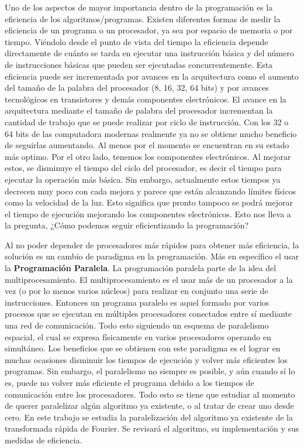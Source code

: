 \documentclass{report}
\begin{document}
Uno de los aspectos de mayor importancia dentro de la programación es la eficiencia de los algoritmos/programas. Existen diferentes formas de medir la eficiencia de un programa o un procesador, ya sea por espacio de memoria o por tiempo. Viéndolo desde el punto de vista del tiempo la eficiencia depende directamente de cuánto se tarda en ejecutar una instrucción básica y del número de instrucciones básicas que pueden ser ejecutadas concurrentemente. Esta eficiencia puede ser incrementada por avances en la arquitectura como el aumento del tamaño de la palabra del procesador (8, 16, 32, 64 bits) y por avances tecnológicos en transistores y demás componentes electrónicos. El avance en la arquitectura mediante el tamaño de palabra del procesador incrementan la cantidad de trabajo que se puede realizar por ciclo de instrucción. Con los 32 o 64 bits de las computadora modernas realmente ya no se obtiene mucho beneficio de seguirlas aumentando. Al menos por el momento se encuentran en su estado más optimo. Por el otro lado, tenemos los componentes electrónicos. Al mejorar estos, se disminuye el tiempo del ciclo del procesador, es decir el tiempo para ejecutar la operación más básica. Sin embargo, actualmente estos tiempos ya decrecen muy poco con cada mejora y parece que están alcanzando límites físicos como la velocidad de la luz. Esto significa que pronto tampoco se podrá mejorar el tiempo de ejecución mejorando los componentes electrónicos. Esto nos lleva a la pregunta, ¿Cómo podemos seguir eficientizando la programación? \medskip

Al no poder depender de procesadores más rápidos para obtener más eficiencia, la solución es un cambio de paradigma en la programación. Más en específico el usar la \textbf{Programación Paralela}. La programación paralela parte de la idea del multiprocesamiento. El multiprocesamiento es el usar más de un procesador a la vez (o por lo menos varios núcleos) para realizar en conjunto una serie de instrucciones. Entonces un programa paralelo es aquel formado por varios procesos que se ejecutan en múltiples procesadores conectados entre sí mediante una red de comunicación. Todo esto siguiendo un esquema de paralelismo espacial, el cual se expresa físicamente en varios procesadores operando en simultáneo. Los beneficios que se obtienen con este paradigma es el lograr en muchas ocasiones disminuir los tiempos de ejecución y volver más eficientes los programas. Sin embargo, el paralelismo no siempre es posible, y aún cuando sí lo es, puede no volver más eficiente el programa debido a los tiempos de comunicación entre los procesadores. Todo esto se tiene que estudiar al momento de querer paralelizar algún algoritmo ya existente, o al tratar de crear uno desde cero. En este trabajo se estudia la paralelización del algoritmo ya existente de la transformada rápida de Fourier. Se revisará el algoritmo, su implementación y sus medidas de eficiencia.\medskip
\end{document}
